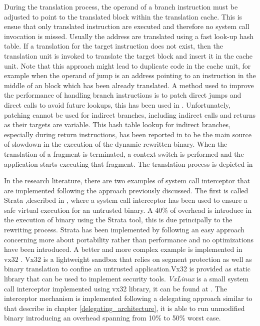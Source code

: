 During the translation process, the operand of a branch instruction must be adjusted to point to the translated block within the translation cache. This is ensue that only translated instruction are executed and therefore no system call invocation is missed. Usually the address are translated using a fast look-up hash table. 
If a translation for the target instruction does not exist, then the translation unit is invoked to translate the target block and insert it in the cache unit. Note that this approach might lead to duplicate code in the cache unit, for example when the operand of jump is an address pointing to an instruction in the middle of an block which has been already translated. A method used to improve the performance of handling branch instructions is to patch direct jumps and direct calls to avoid future lookups, this has been used in \cite{vx32, DynamoRio}. Unfortunately, patching cannot be used for indirect branches, including indirect calls and returns as their targets are variable. This hash table lookup for indirect branches, especially during return instructions, has been reported in \cite{vx32} to be the main source of slowdown in the execution of the dynamic rewritten binary. When the translation of a fragment is terminated, a context switch is performed and the application starts executing that fragment. The translation process is depicted in 


In the research literature, there are two examples of system call interceptor that are implemented following the approach previously discussed. The first is called Strata ,described in \cite{Strata}, where a system call interceptor has been used to ensure a safe virtual execution for an untrusted binary.  A 40\% of overhead is introduce in the execution of binary using the Strata tool, this is due principally to the rewriting process.  Strata has been implemented by following an easy approach concerning more about portability rather than performance and no optimizations have been introduced. A better and more complex example is implemented in vx32 \cite{vx32}. Vx32 is a lightweight sandbox that relies on segment protection as well as binary translation to confine an untrusted application.Vx32 is provided as static library that can be used to implement security tools. \emph{VxLinux} is a small system call interceptor implemented using vx32 library, it can be found at \cite{soft:vx32}. The interceptor mechanism is implemented following a delegating approach similar to that describe in chapter \ref{delegating_architecture}, it is able to run unmodified binary introducing an overhead spanning from 10\% to 50\% worst case. 


